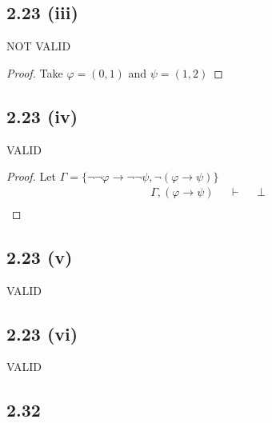 \documentclass[12pt]{article}
\begin{document}
\subsection*{2.23 (iii)} NOT VALID
\begin{proof}
Take $\varphi = (0,1)$ and $\psi = (1,2)$
\end{proof}
\subsection*{2.23 (iv)} VALID
\begin{proof}
Let $\Gamma = \{\neg \neg \varphi \rightarrow \neg \neg \psi, \neg(\varphi \rightarrow \psi)\}$
\begin{align*}
    \Gamma, (\varphi \rightarrow \psi) &&\vdash&& \bot \\
\end{align*}
\end{proof}
\subsection*{2.23 (v)} VALID
\subsection*{2.23 (vi)} VALID


\subsection*{2.32}
\end{document}
